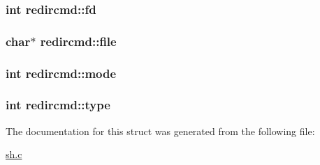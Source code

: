 \subsubsection[{\texorpdfstring{fd}{fd}}]{\setlength{\rightskip}{0pt plus 5cm}int redircmd\+::fd}\hypertarget{structredircmd_a1d4b8ba36b5bb4e9e4af58a6d58934a1}{}\label{structredircmd_a1d4b8ba36b5bb4e9e4af58a6d58934a1}
\subsubsection[{\texorpdfstring{file}{file}}]{\setlength{\rightskip}{0pt plus 5cm}char$\ast$ redircmd\+::file}\hypertarget{structredircmd_adfbfcf9111724e5b453bab2ed3ee308f}{}\label{structredircmd_adfbfcf9111724e5b453bab2ed3ee308f}
\subsubsection[{\texorpdfstring{mode}{mode}}]{\setlength{\rightskip}{0pt plus 5cm}int redircmd\+::mode}\hypertarget{structredircmd_a36b522983b6a0c0efdaea471b08d120b}{}\label{structredircmd_a36b522983b6a0c0efdaea471b08d120b}
\subsubsection[{\texorpdfstring{type}{type}}]{\setlength{\rightskip}{0pt plus 5cm}int redircmd\+::type}\hypertarget{structredircmd_ac3e4a2de55ca2175ede05a3f49bbb835}{}\label{structredircmd_ac3e4a2de55ca2175ede05a3f49bbb835}


The documentation for this struct was generated from the following file\+:\begin{DoxyCompactItemize}
\item 
\hyperlink{sh_8c}{sh.\+c}\end{DoxyCompactItemize}
